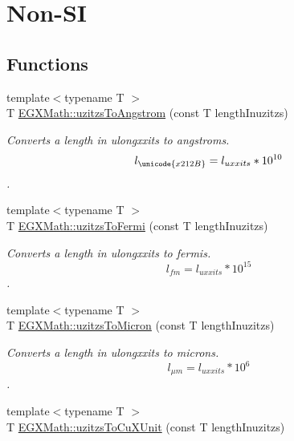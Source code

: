\hypertarget{group___e_g_x_math-_conversions-_length_conversions-_non-_s_i-uzitzs-_non-_s_i}{}\section{Non-\/\+SI}
\label{group___e_g_x_math-_conversions-_length_conversions-_non-_s_i-uzitzs-_non-_s_i}
\subsection*{Functions}
\begin{DoxyCompactItemize}
\item 
{\footnotesize template$<$typename T $>$ }\\T \mbox{\hyperlink{group___e_g_x_math-_conversions-_length_conversions-_non-_s_i-uzitzs-_non-_s_i_gaaaecee65b1db5abcc71e18526e7073eb}{E\+G\+X\+Math\+::uzitzs\+To\+Angstrom}} (const T length\+Inuzitzs)
\begin{DoxyCompactList}\small\item\em Converts a length in ulongxxits to angstroms. \[ l_{\unicode{x212B}}=l_{uxxits} * 10^{10} \]. \end{DoxyCompactList}\item 
{\footnotesize template$<$typename T $>$ }\\T \mbox{\hyperlink{group___e_g_x_math-_conversions-_length_conversions-_non-_s_i-uzitzs-_non-_s_i_ga920cd8aae6bc9f70faa49a6a5c988040}{E\+G\+X\+Math\+::uzitzs\+To\+Fermi}} (const T length\+Inuzitzs)
\begin{DoxyCompactList}\small\item\em Converts a length in ulongxxits to fermis. \[ l_{fm}=l_{uxxits} * 10^{15} \]. \end{DoxyCompactList}\item 
{\footnotesize template$<$typename T $>$ }\\T \mbox{\hyperlink{group___e_g_x_math-_conversions-_length_conversions-_non-_s_i-uzitzs-_non-_s_i_ga695a8fd8870537930d6378e99ad2aa9f}{E\+G\+X\+Math\+::uzitzs\+To\+Micron}} (const T length\+Inuzitzs)
\begin{DoxyCompactList}\small\item\em Converts a length in ulongxxits to microns. \[ l_{\mu m}=l_{uxxits} * 10^{6} \]. \end{DoxyCompactList}\item 
{\footnotesize template$<$typename T $>$ }\\T \mbox{\hyperlink{group___e_g_x_math-_conversions-_length_conversions-_non-_s_i-uzitzs-_non-_s_i_gab25470e41b88c41d4bf32622baa6c472}{E\+G\+X\+Math\+::uzitzs\+To\+Cu\+X\+Unit}} (const T length\+Inuzitzs)

\end{DoxyCompactItemize}
